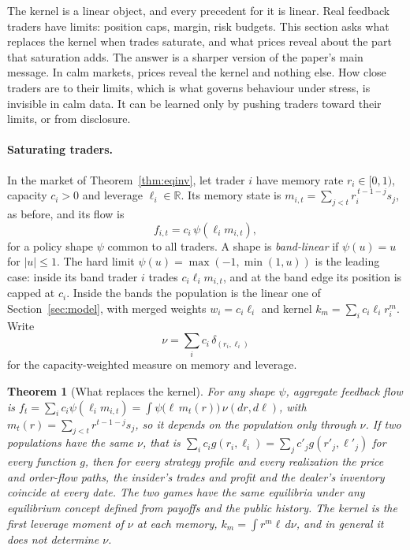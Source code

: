 \documentclass[12pt]{article}
\newtheorem{theorem}{Theorem}[section]
\theoremstyle{definition}
\theoremstyle{remark}
\begin{document}
The kernel is a linear object, and every precedent for it is linear. Real feedback traders have limits: position caps, margin, risk budgets. This section asks what replaces the kernel when trades saturate, and what prices reveal about the part that saturation adds. The answer is a sharper version of the paper's main message. In calm markets, prices reveal the kernel and nothing else. How close traders are to their limits, which is what governs behaviour under stress, is invisible in calm data. It can be learned only by pushing traders toward their limits, or from disclosure.

\paragraph{Saturating traders.} In the market of Theorem~\ref{thm:eqinv}, let trader $i$ have memory rate $r_i\in[0,1)$, capacity $c_i>0$ and leverage $\ell_i\in\mathbb R$. Its memory state is $m_{i,t}=\sum_{j<t}r_i^{\,t-1-j}s_j$, as before, and its flow is
\[
 f_{i,t}=c_i\,\psi(\ell_i m_{i,t}),
\]
for a policy shape $\psi$ common to all traders. A shape is \emph{band-linear} if $\psi(u)=u$ for $|u|\le1$. The hard limit $\psi(u)=\max(-1,\min(1,u))$ is the leading case: inside its band trader $i$ trades $c_i\ell_im_{i,t}$, and at the band edge its position is capped at $c_i$. Inside the bands the population is the linear one of Section~\ref{sec:model}, with merged weights $w_i=c_i\ell_i$ and kernel $k_m=\sum_ic_i\ell_ir_i^m$. Write
\[
 \nu=\sum_ic_i\,\delta_{(r_i,\ell_i)}
\]
for the capacity-weighted measure on memory and leverage.

\begin{theorem}[What replaces the kernel]\label{thm:satsuff}
For any shape $\psi$, aggregate feedback flow is $f_t=\sum_ic_i\psi(\ell_im_{i,t})=\int\psi\bigl(\ell\,m_t(r)\bigr)\,\nu(dr,d\ell)$, with $m_t(r)=\sum_{j<t}r^{t-1-j}s_j$, so it depends on the population only through $\nu$. If two populations have the same $\nu$, that is $\sum_ic_ig(r_i,\ell_i)=\sum_jc'_jg(r'_j,\ell'_j)$ for every function $g$, then for every strategy profile and every realization the price and order-flow paths, the insider's trades and profit and the dealer's inventory coincide at every date. The two games have the same equilibria under any equilibrium concept defined from payoffs and the public history. The kernel is the first leverage moment of $\nu$ at each memory, $k_m=\int r^m\ell\,d\nu$, and in general it does not determine $\nu$.
\end{theorem}
\end{document}
